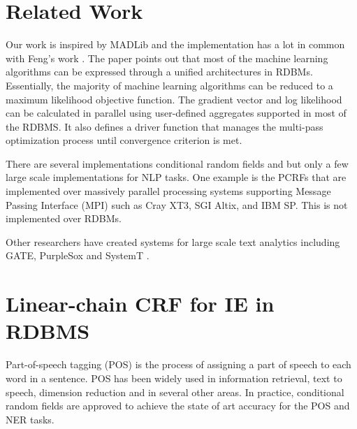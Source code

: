 \documentclass[11pt,letterpaper]{article}
\begin{document}
\section{Related Work}
Our work is inspired by MADLib \cite{Hellerstein:2012:MAL:2367502.2367510} and the implementation has a lot in common with 
Feng's work \cite{Feng:2012:TUA:2213836.2213874}.
The paper points out that most of the machine learning algorithms can be expressed through
a unified architectures in RDBMs.
Essentially, the majority of machine learning algorithms can be reduced to a maximum likelihood objective function. %
The gradient vector and log likelihood can be calculated in parallel using user-defined aggregates supported in most of the RDBMS.
It also defines a driver function that manages the multi-pass optimization process until convergence criterion is met.

There are several implementations conditional random fields and but only a few 
large scale implementations for NLP tasks.
One example is the PCRFs \cite{phan2004flexcrfs} that are implemented over
massively parallel processing systems supporting Message Passing Interface (MPI) such as 
Cray XT3, SGI Altix, and IBM SP.
This is not implemented over RDBMs.

Other researchers have created systems for large scale text analytics including 
GATE, PurpleSox and SystemT
\cite{Cunningham2011a,Bohannon:2009:PSE:1519103.1519107,Li:2011:SDI:2002440.2002459}. 


\section{Linear-chain CRF for IE in RDBMS}
Part-of-speech tagging (POS) is the process of assigning 
a part of speech to each word in a sentence. 
POS has been widely used in information retrieval, text to speech, dimension reduction and in several other areas. 
In practice, conditional random fields are approved to achieve the state of art accuracy for the POS and NER tasks.
\end{document}
